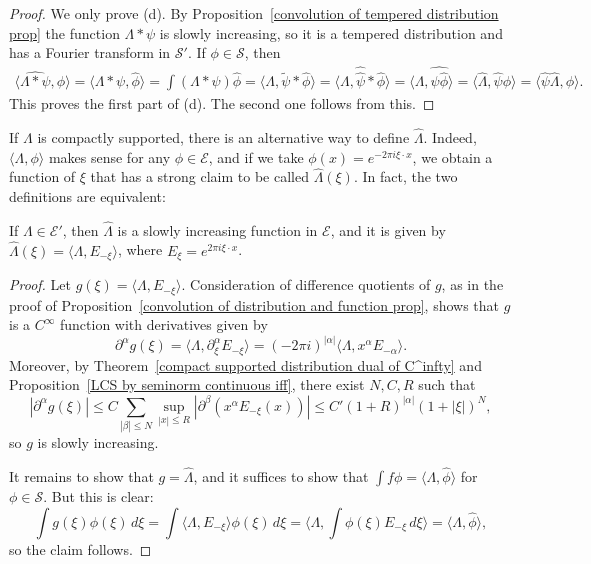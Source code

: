 \begin{proof}
We only prove (d). By Proposition~\ref{convolution of tempered distribution prop} the function $\Lambda\ast\psi$ is slowly increasing, so it is a tempered distribution and has a Fourier transform in $\mathscr{S}'$. If $\phi\in\mathscr{S}$, then
\begin{align*}
\langle\widehat{\Lambda\ast\psi},\phi\rangle=\langle\Lambda\ast\psi,\hat{\phi}\rangle=\int(\Lambda\ast\psi)\hat{\phi}=\langle\Lambda,\tilde{\psi}\ast\hat{\phi}\rangle=\langle\Lambda,\hat{\hat{\psi}}\ast\hat{\phi}\rangle=\langle\Lambda,\widehat{\psi\hat{\phi}}\rangle=\langle\hat{\Lambda},\hat{\psi}\phi\rangle=\langle\hat{\psi}\hat{\Lambda},\phi\rangle.
\end{align*}
This proves the first part of (d). The second one follows from this.
\end{proof}
If $\Lambda$ is compactly supported, there is an alternative way to define $\hat{\Lambda}$. Indeed, $\langle\Lambda,\phi\rangle$ makes sense for any $\phi\in\mathscr{E}$, and if we take $\phi(x)=e^{-2\pi i\xi\cdot x}$, we obtain a function of $\xi$ that has a strong claim to be called $\hat{\Lambda}(\xi)$. In fact, the two definitions are equivalent:
\begin{proposition}\label{Fourier transform of compact distribution}
If $\Lambda\in\mathscr{E}'$, then $\hat{\Lambda}$ is a slowly increasing function in $\mathscr{E}$, and it is given by $\hat{\Lambda}(\xi)=\langle\Lambda,E_{-\xi}\rangle$, where $E_\xi=e^{2\pi i\xi\cdot x}$.
\end{proposition}
\begin{proof}
Let $g(\xi)=\langle\Lambda,E_{-\xi}\rangle$. Consideration of difference quotients of $g$, as in the proof of Proposition~\ref{convolution of distribution and function prop}, shows that $g$ is a $C^\infty$ function with derivatives given by
\[\partial^\alpha g(\xi)=\langle\Lambda,\partial^\alpha_\xi E_{-\xi}\rangle=(-2\pi i)^{|\alpha|}\langle\Lambda,x^\alpha E_{-\alpha}\rangle.\]
Moreover, by Theorem~\ref{compact supported distribution dual of C^infty} and Proposition~\ref{LCS by seminorm continuous iff}, there exist $N,C,R$ such that
\[|\partial^\alpha g(\xi)|\leq C\sum_{|\beta|\leq N}\sup_{|x|\leq R}|\partial^\beta(x^\alpha E_{-\xi}(x))|\leq C'(1+R)^{|\alpha|}(1+|\xi|)^N,\]
so $g$ is slowly increasing.\par
It remains to show that $g=\hat{\Lambda}$, and it suffices to show that $\int f\phi=\langle\Lambda,\hat{\phi}\rangle$ for $\phi\in\mathscr{S}$. But this is clear:
\[\int g(\xi)\phi(\xi)\,d\xi=\int\langle\Lambda,E_{-\xi}\rangle\phi(\xi)\,d\xi=\langle\Lambda,\int\phi(\xi)E_{-\xi}\,d\xi\rangle=\langle\Lambda,\hat{\phi}\rangle,\]
so the claim follows.
\end{proof}
